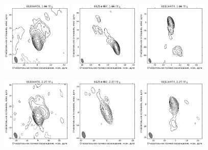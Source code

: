 \begin{figure}
  \centering

  \includegraphics[width=0.3\textwidth]{0133+476_L.pdf}
  \includegraphics[width=0.3\textwidth]{0125+487_L.pdf}
  \includegraphics[width=0.3\textwidth]{0151+474_L.pdf}


  \includegraphics[width=0.3\textwidth]{0133+476_S.pdf}
  \includegraphics[width=0.3\textwidth]{0125+487_S.pdf}
  \includegraphics[width=0.3\textwidth]{0151+474_S.pdf}



\end{figure}
